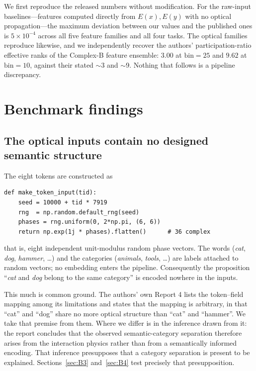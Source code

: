 \documentclass[11pt,a4paper]{article}
\begin{document}
We first reproduce the released numbers without modification. For the
raw-input baselines---features computed directly from $E(x),E(y)$ with no
optical propagation---the maximum deviation between our values and the
published ones is $5\times10^{-4}$ across all five feature families and all
four tasks. The optical families reproduce likewise, and we independently
recover the authors' participation-ratio effective ranks of the Complex-B
feature ensemble: $3.00$ at $\mathrm{bin}=25$ and $9.62$ at
$\mathrm{bin}=10$, against their stated $\sim$3 and $\sim$9. Nothing that
follows is a pipeline discrepancy.

\section{Benchmark findings}
\label{sec:benchmark}

\subsection{The optical inputs contain no designed semantic structure}

The eight tokens are constructed as
\begin{verbatim}
def make_token_input(tid):
    seed = 10000 + tid * 7919
    rng  = np.random.default_rng(seed)
    phases = rng.uniform(0, 2*np.pi, (6, 6))
    return np.exp(1j * phases).flatten()      # 36 complex
\end{verbatim}
that is, eight independent unit-modulus random phase vectors. The words
(\emph{cat}, \emph{dog}, \emph{hammer}, \dots) and the categories
(\emph{animals}, \emph{tools}, \dots) are labels attached to random vectors;
no embedding enters the pipeline. Consequently the proposition ``\emph{cat}
and \emph{dog} belong to the same category'' is encoded nowhere in the inputs.

This much is common ground. The authors' own Report 4 lists the token--field
mapping among its limitations and states that the mapping is arbitrary, in
that ``cat'' and ``dog'' share no more optical structure than ``cat'' and
``hammer''. We take that premise from them. Where we differ is in the
inference drawn from it: the report concludes that the observed
semantic-category separation therefore arises from the interaction physics
rather than from a semantically informed encoding. That inference presupposes
that a category separation is present to be explained. Sections~\ref{sec:B3}
and~\ref{sec:B4} test precisely that presupposition.
\end{document}
